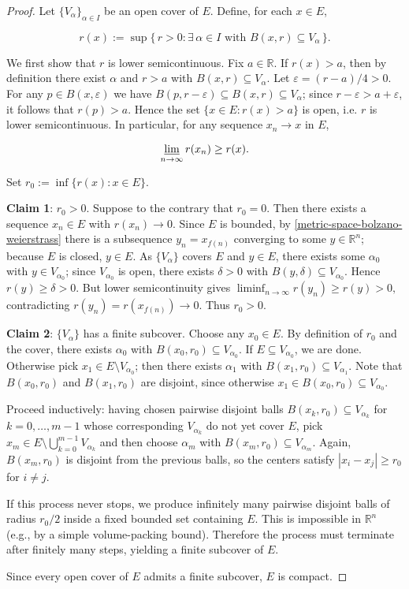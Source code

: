 \begin{proof}
Let $\{V_\alpha\}_{\alpha \in I}$ be an open cover of $E$. Define, for each $x \in E$,

\[
  r(x) := \sup\{\, r > 0 : \exists\, \alpha \in I \text{ with } B(x,r) \subseteq V_\alpha \,\}.
\]


We first show that $r$ is lower semicontinuous. Fix $a \in \mathbb{R}$. 
If $r(x) > a$,
then by definition there exist $\alpha$ and $r>a$ with $B(x,r) \subseteq V_\alpha$.
Let $\varepsilon = (r-a)/4 > 0$. For any $p \in B(x,\varepsilon)$ we have
$B(p,r-\varepsilon) \subseteq B(x,r) \subseteq V_\alpha$; since $r-\varepsilon > a+\varepsilon$,
it follows that $r(p) > a$. Hence the set $\{x \in E : r(x) > a\}$ is open, i.e. $r$ is
lower semicontinuous. In particular, for any sequence $x_n \to x$ in $E$,

\[
  \varliminf_{n \to \infty} r(x_n) \ge r(x).
\]

Set $r_0 := \inf\{ r(x) : x \in E \}$.

\textbf{Claim 1}: $r_0 > 0$. Suppose to the contrary that $r_0 = 0$. Then there exists a
sequence $x_n \in E$ with $r(x_n) \to 0$. Since $E$ is bounded, by \cref{metric-space-bolzano-weierstrass}
there is a subsequence $y_n = x_{f(n)}$ converging to some $y \in \mathbb{R}^n$; because
$E$ is closed, $y \in E$. As $\{V_\alpha\}$ covers $E$ and $y \in E$, there exists some
$\alpha_0$ with $y \in V_{\alpha_0}$; since $V_{\alpha_0}$ is open, there exists
$\delta>0$ with $B(y,\delta) \subseteq V_{\alpha_0}$. Hence $r(y) \ge \delta > 0$.
But lower semicontinuity gives
$
  \liminf_{n \to \infty} r(y_n) \ge r(y) > 0,
$
contradicting $r(y_n)=r(x_{f(n)}) \to 0$. Thus $r_0>0$.

\textbf{Claim 2}: $\{V_\alpha\}$ has a finite subcover. Choose any $x_0 \in E$.
By definition of $r_0$ and the cover, there exists $\alpha_0$ with
$B(x_0,r_0) \subseteq V_{\alpha_0}$. If $E \subseteq V_{\alpha_0}$, we are done.
Otherwise pick $x_1 \in E \setminus V_{\alpha_0}$; then there exists $\alpha_1$
with $B(x_1,r_0) \subseteq V_{\alpha_1}$. Note that $B(x_0,r_0)$ and $B(x_1,r_0)$
are disjoint, since otherwise $x_1 \in B(x_0,r_0) \subseteq V_{\alpha_0}$.

Proceed inductively: having chosen pairwise disjoint balls $B(x_k,r_0) \subseteq V_{\alpha_k}$
for $k=0,\dots,m-1$ whose corresponding $V_{\alpha_k}$ do not yet cover $E$, pick
$x_m \in E \setminus \bigcup_{k=0}^{m-1} V_{\alpha_k}$ and then choose $\alpha_m$
with $B(x_m,r_0) \subseteq V_{\alpha_m}$. Again, $B(x_m,r_0)$ is disjoint from the
previous balls, so the centers satisfy $|x_i - x_j| \ge r_0$ for $i \ne j$.

If this process never stops, we produce infinitely many pairwise disjoint balls of
radius $r_0/2$ inside a fixed bounded set containing $E$. This is impossible in
$\mathbb{R}^n$ (e.g., by a simple volume-packing bound). Therefore the process must
terminate after finitely many steps, yielding a finite subcover of $E$.

Since every open cover of $E$ admits a finite subcover, $E$ is compact.
\end{proof}

